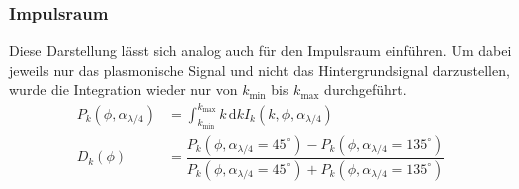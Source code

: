 \documentclass[a4paper, titlepage,  ngerman]{book}
\begin{document}
		\subsubsection{Impulsraum}
		Diese Darstellung lässt sich analog auch für den Impulsraum einführen. Um dabei jeweils nur das plasmonische Signal und nicht das Hintergrundsignal darzustellen, wurde die Integration wieder nur von  $k_\mathrm{min}$ bis $k_\mathrm{max}$ durchgeführt.
		\begin{align}
			P_k(\phi, \alpha_{\lambda/4}) &= \int_{k_\mathrm{min}}^{k_\mathrm{max}}k\,\mathrm{d}k I_k(k, \phi, \alpha_{\lambda /4}) \\
			D_k(\phi) &= \dfrac{P_k(\phi, \alpha_{\lambda/4} = 45^\circ) - P_k(\phi, \alpha_{\lambda/4} = 135^\circ)}{P_k(\phi, \alpha_{\lambda/4} = 45^\circ) + P_k(\phi, \alpha_{\lambda/4} = 135^\circ)}
		\end{align}
\end{document}
